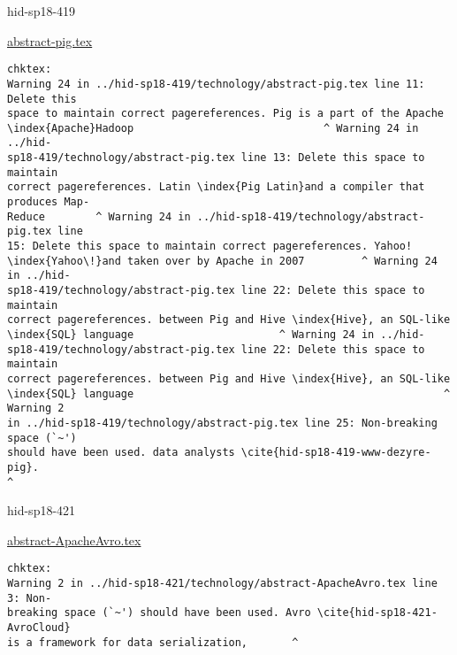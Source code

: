\begin{IU}

hid-sp18-419

\href{https://github.com/cloudmesh-community/hid-sp18-419/blob/master//technology/abstract-pig.tex}{abstract-pig.tex}

\begin{tiny}
\begin{verbatim}
chktex:
Warning 24 in ../hid-sp18-419/technology/abstract-pig.tex line 11: Delete this
space to maintain correct pagereferences. Pig is a part of the Apache
\index{Apache}Hadoop                              ^ Warning 24 in ../hid-
sp18-419/technology/abstract-pig.tex line 13: Delete this space to maintain
correct pagereferences. Latin \index{Pig Latin}and a compiler that produces Map-
Reduce        ^ Warning 24 in ../hid-sp18-419/technology/abstract-pig.tex line
15: Delete this space to maintain correct pagereferences. Yahoo!
\index{Yahoo\!}and taken over by Apache in 2007         ^ Warning 24 in ../hid-
sp18-419/technology/abstract-pig.tex line 22: Delete this space to maintain
correct pagereferences. between Pig and Hive \index{Hive}, an SQL-like
\index{SQL} language                       ^ Warning 24 in ../hid-
sp18-419/technology/abstract-pig.tex line 22: Delete this space to maintain
correct pagereferences. between Pig and Hive \index{Hive}, an SQL-like
\index{SQL} language                                                 ^ Warning 2
in ../hid-sp18-419/technology/abstract-pig.tex line 25: Non-breaking space (`~')
should have been used. data analysts \cite{hid-sp18-419-www-dezyre-pig}.
^
\end{verbatim}
\end{tiny}
\end{IU}



\begin{IU}

hid-sp18-421

\href{https://github.com/cloudmesh-community/hid-sp18-421/blob/master//technology/abstract-ApacheAvro.tex}{abstract-ApacheAvro.tex}

\begin{tiny}
\begin{verbatim}
chktex:
Warning 2 in ../hid-sp18-421/technology/abstract-ApacheAvro.tex line 3: Non-
breaking space (`~') should have been used. Avro \cite{hid-sp18-421-AvroCloud}
is a framework for data serialization,       ^
\end{verbatim}
\end{tiny}
\end{IU}

